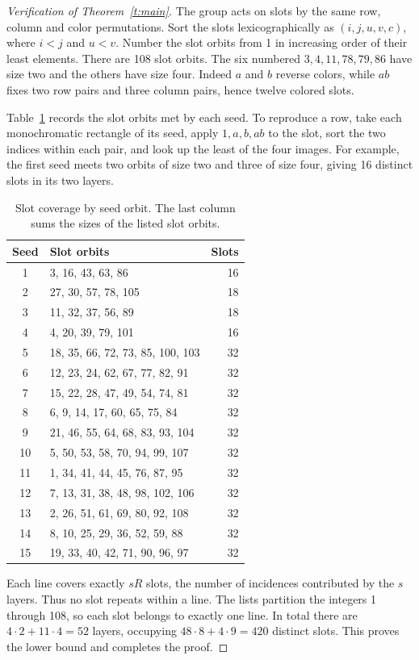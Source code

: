 \documentclass[11pt]{article}
\begin{document}
\begin{proof}[Verification of Theorem~\ref{t:main}]
The group acts on slots by the same row, column and color permutations. Sort the slots lexicographically as $(i,j,u,v,c)$, where $i<j$ and $u<v$. Number the slot orbits from 1 in increasing order of their least elements. There are 108 slot orbits. The six numbered $3,4,11,78,79,86$ have size two and the others have size four. Indeed $a$ and $b$ reverse colors, while $ab$ fixes two row pairs and three column pairs, hence twelve colored slots.

Table~\ref{t:orbits} records the slot orbits met by each seed. To reproduce a row, take each monochromatic rectangle of its seed, apply $1,a,b,ab$ to the slot, sort the two indices within each pair, and look up the least of the four images. For example, the first seed meets two orbits of size two and three of size four, giving 16 distinct slots in its two layers.

\begin{table}[ht]\centering
\caption{Slot coverage by seed orbit. The last column sums the sizes of the listed slot orbits.}\label{t:orbits}
\small\begin{tabular}{c l r}\toprule Seed&Slot orbits&Slots\\\midrule
1 & 3, 16, 43, 63, 86 & 16\\
2 & 27, 30, 57, 78, 105 & 18\\
3 & 11, 32, 37, 56, 89 & 18\\
4 & 4, 20, 39, 79, 101 & 16\\
5 & 18, 35, 66, 72, 73, 85, 100, 103 & 32\\
6 & 12, 23, 24, 62, 67, 77, 82, 91 & 32\\
7 & 15, 22, 28, 47, 49, 54, 74, 81 & 32\\
8 & 6, 9, 14, 17, 60, 65, 75, 84 & 32\\
9 & 21, 46, 55, 64, 68, 83, 93, 104 & 32\\
10 & 5, 50, 53, 58, 70, 94, 99, 107 & 32\\
11 & 1, 34, 41, 44, 45, 76, 87, 95 & 32\\
12 & 7, 13, 31, 38, 48, 98, 102, 106 & 32\\
13 & 2, 26, 51, 61, 69, 80, 92, 108 & 32\\
14 & 8, 10, 25, 29, 36, 52, 59, 88 & 32\\
15 & 19, 33, 40, 42, 71, 90, 96, 97 & 32\\
\bottomrule\end{tabular}\end{table}

Each line covers exactly $sR$ slots, the number of incidences contributed by the $s$ layers. Thus no slot repeats within a line. The lists partition the integers 1 through 108, so each slot belongs to exactly one line. In total there are $4\cdot2+11\cdot4=52$ layers, occupying $48\cdot8+4\cdot9=420$ distinct slots. This proves the lower bound and completes the proof.
\end{proof}
\end{document}
